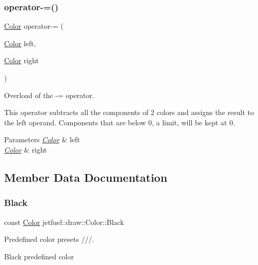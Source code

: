 \subsubsection{\texorpdfstring{operator-\/=()}{operator-=()}}
{\footnotesize\ttfamily \hyperlink{classjetfuel_1_1draw_1_1Color}{Color} operator-\/= (\begin{DoxyParamCaption}\item[{\hyperlink{classjetfuel_1_1draw_1_1Color}{Color}}]{left,  }\item[{\hyperlink{classjetfuel_1_1draw_1_1Color}{Color}}]{right }\end{DoxyParamCaption})\hspace{0.3cm}{\ttfamily [related]}}



Overload of the -\/= operator. 

This operator subtracts all the components of 2 colors and assigns the result to the left operand. Components that are below 0, a limit, will be kept at 0.


\begin{DoxyParams}{Parameters}
{\em \hyperlink{classjetfuel_1_1draw_1_1Color}{Color}} & left \\
\hline
{\em \hyperlink{classjetfuel_1_1draw_1_1Color}{Color}} & right \\
\hline
\end{DoxyParams}


\subsection{Member Data Documentation}
\mbox{\label{classjetfuel_1_1draw_1_1Color_af7ba2fe7adb5154cde6f5563c5582988}} 
\subsubsection{\texorpdfstring{Black}{Black}}
{\footnotesize\ttfamily const \hyperlink{classjetfuel_1_1draw_1_1Color}{Color} jetfuel\+::draw\+::\+Color\+::\+Black\hspace{0.3cm}{\ttfamily [static]}}



Predefined color presets ///. 

Black predefined color \mbox{\label{classjetfuel_1_1draw_1_1Color_a282cc70a95a42570a350d2de16376346}} 
